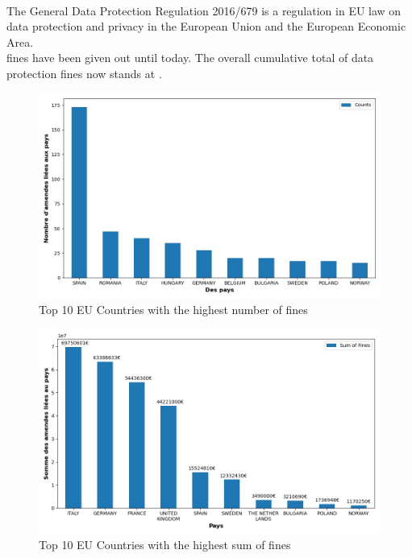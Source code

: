 \documentclass[12pt]{article}
\begin{document}

\noindent\HorRule{3pt} \\[-0.75\baselineskip]
\HorRule{1pt}

\vspace{0.5cm}
	\SepRule
\vspace{0.5cm}


\justify
The General Data Protection Regulation 2016/679 is a regulation in EU law on data protection and privacy in the European Union and the European Economic Area. \\
\textbf{} fines have been given out until today.
The overall cumulative total of data protection fines now stands at \textbf{}.


\begin{figure}
	[H]\centering\includegraphics[width=0.7\linewidth]{graphs/top10_countries}
      \caption{Top 10 EU Countries with the highest number of fines }
\end{figure}
\begin{figure}
	[H]\centering\includegraphics[width=0.7\linewidth]{graphs/top10_countries_fines}
	\caption{Top 10 EU Countries with the highest sum of fines}
 \end{figure}
\end{document}
